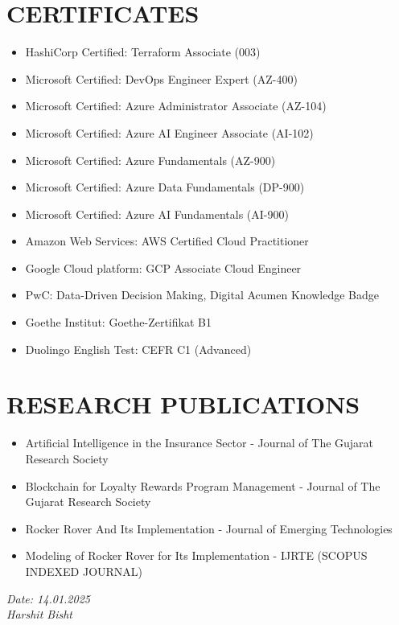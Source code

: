 \documentclass[11pt,a4paper]{article}
\begin{document}
\section*{CERTIFICATES}
\begin{itemize}
    \item HashiCorp Certified: Terraform Associate (003)
    \item Microsoft Certified: DevOps Engineer Expert (AZ-400)
    \item Microsoft Certified: Azure Administrator Associate (AZ-104)
    \item Microsoft Certified: Azure AI Engineer Associate (AI-102)
    \item Microsoft Certified: Azure Fundamentals (AZ-900)
    \item Microsoft Certified: Azure Data Fundamentals (DP-900)
    \item Microsoft Certified: Azure AI Fundamentals (AI-900)
    \item Amazon Web Services: AWS Certified Cloud Practitioner
    \item Google Cloud platform: GCP Associate Cloud Engineer
    \item PwC: Data-Driven Decision Making, Digital Acumen Knowledge Badge
    \item Goethe Institut: Goethe-Zertifikat B1
    \item Duolingo English Test: CEFR C1 (Advanced)
\end{itemize}

\section*{RESEARCH PUBLICATIONS}
\begin{itemize}
    \item Artificial Intelligence in the Insurance Sector - Journal of The Gujarat Research Society
    \item Blockchain for Loyalty Rewards Program Management - Journal of The Gujarat Research Society
    \item Rocker Rover And Its Implementation - Journal of Emerging Technologies
    \item Modeling of Rocker Rover for Its Implementation - IJRTE (SCOPUS INDEXED JOURNAL)
\end{itemize}

\vfill %
\noindent %
\begin{flushright} %
    \textit{Date: 14.01.2025}\\ %
    \textit{Harshit Bisht} %
\end{flushright}
\end{document}
